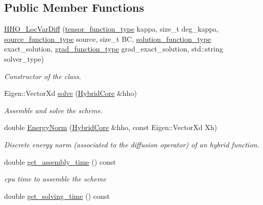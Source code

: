 \subsection*{Public Member Functions}
\begin{DoxyCompactItemize}
\item 
\hyperlink{group__HHO__LocVarDiff_ga5f2ab34d1e5afb3d83b548a1cb09f83a}{H\+H\+O\+\_\+\+Loc\+Var\+Diff} (\hyperlink{classHArDCore2D_1_1HHO__LocVarDiff_a15bd0c2320b456efcc07c11842c13492}{tensor\+\_\+function\+\_\+type} kappa, size\+\_\+t deg\+\_\+kappa, \hyperlink{classHArDCore2D_1_1HHO__LocVarDiff_a0bd07aa3ccc1aa9dd3c9573a5ab1c7dd}{source\+\_\+function\+\_\+type} source, size\+\_\+t BC, \hyperlink{classHArDCore2D_1_1HHO__LocVarDiff_a8bb87b6170b8a77e14d343bf76cac3d6}{solution\+\_\+function\+\_\+type} exact\+\_\+solution, \hyperlink{classHArDCore2D_1_1HHO__LocVarDiff_a00b073818ecee542bb74860b1c204d49}{grad\+\_\+function\+\_\+type} grad\+\_\+exact\+\_\+solution, std\+::string solver\+\_\+type)
\begin{DoxyCompactList}\small\item\em Constructor of the class. \end{DoxyCompactList}\item 
Eigen\+::\+Vector\+Xd \hyperlink{group__HHO__LocVarDiff_ga74eac0904256440c429fb9502112a867}{solve} (\hyperlink{classHArDCore2D_1_1HybridCore}{Hybrid\+Core} \&hho)
\begin{DoxyCompactList}\small\item\em Assemble and solve the scheme. \end{DoxyCompactList}\item 
double \hyperlink{group__HHO__LocVarDiff_gaf359d2047dc5b2fb8640a01c025fb860}{Energy\+Norm} (\hyperlink{classHArDCore2D_1_1HybridCore}{Hybrid\+Core} \&hho, const Eigen\+::\+Vector\+Xd Xh)
\begin{DoxyCompactList}\small\item\em Discrete energy norm (associated to the diffusion operator) of an hybrid function. \end{DoxyCompactList}\item 
double \hyperlink{group__HHO__LocVarDiff_ga9c37d2cf2744465d0bf50ff02fe185f9}{get\+\_\+assembly\+\_\+time} () const
\begin{DoxyCompactList}\small\item\em cpu time to assemble the scheme \end{DoxyCompactList}\item 
double \hyperlink{group__HHO__LocVarDiff_gad184ecd99c5da4172395a210d0289c12}{get\+\_\+solving\+\_\+time} () const

\end{DoxyCompactItemize}
